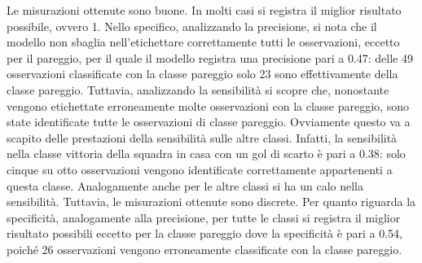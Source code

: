 Le misurazioni ottenute sono buone. In molti casi si registra il miglior risultato possibile, ovvero 1. Nello specifico, analizzando la precisione, si nota che il modello non sbaglia nell’etichettare correttamente tutti le osservazioni, eccetto per il pareggio, per il quale il modello registra una precisione pari a 0.47: delle 49 osservazioni classificate con la classe pareggio solo 23 sono effettivamente della classe pareggio. Tuttavia, analizzando la sensibilità si scopre che, nonostante vengono etichettate erroneamente molte osservazioni con la classe pareggio, sono state identificate tutte le osservazioni di classe pareggio. Ovviamente questo va a scapito delle prestazioni della sensibilità sulle altre classi. Infatti, la sensibilità nella classe vittoria della squadra in casa con un gol di scarto è pari a 0.38: solo cinque su otto osservazioni vengono identificate correttamente appartenenti a questa classe. Analogamente anche per le altre classi si ha un calo nella sensibilità. Tuttavia, le misurazioni ottenute sono discrete. Per quanto riguarda la specificità, analogamente alla precisione, per tutte le classi si registra il miglior risultato possibili eccetto per la classe pareggio dove la specificità è pari a 0.54, poiché 26 osservazioni vengono erroneamente classificate con la classe pareggio.


